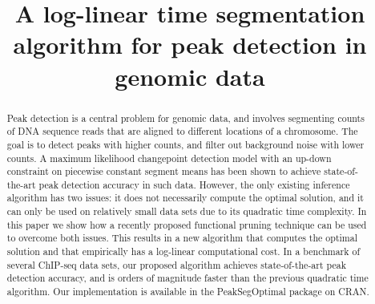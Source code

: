 \documentclass[aoas]{imsart}
\begin{document}
\begin{frontmatter}

\title{A log-linear time segmentation algorithm for peak detection in genomic data}



\begin{abstract}
  Peak detection is a central problem for genomic data, and involves segmenting
  counts of DNA sequence reads that are aligned to different locations of 
  a chromosome. 
  The goal is to detect peaks with higher counts, 
  and filter out background noise with lower counts. A
  maximum likelihood changepoint detection model with an up-down
  constraint on piecewise constant segment means has been shown to
  achieve state-of-the-art peak detection accuracy in such
  data. However, the only existing inference algorithm
  has two issues: it does not necessarily compute the optimal
  solution, and it can only be used on relatively small data sets due
  to its quadratic time complexity. In this paper we show how a
  recently proposed functional pruning technique can be used to
  overcome both issues.
  This results in a new algorithm that computes the optimal
  solution and that empirically has a log-linear computational cost. 
  In a benchmark of several
  ChIP-seq data sets, our proposed algorithm achieves state-of-the-art
  peak detection accuracy, and is orders of magnitude faster than the
  previous quadratic time algorithm. Our implementation is available
  in the PeakSegOptimal package on CRAN.
\end{abstract}



\end{frontmatter}
\end{document}
